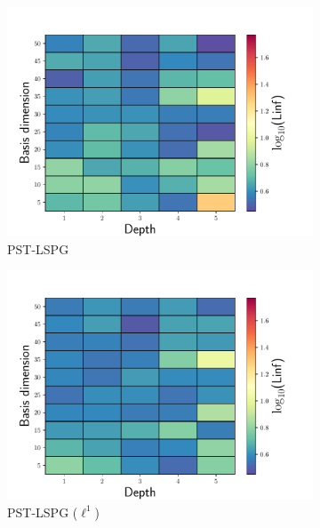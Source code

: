 \documentclass[3p,computermodern,10pt]{elsarticle}
\begin{document}
\begin{figure}
\begin{center}
\begin{subfigure}[t]{0.32\textwidth}
\includegraphics[trim={0cm 0cm 0cm 0cm},clip,width=1.0\linewidth]{code/burgers/synapse_models/basis_study/results/Linf_LS.pdf}
\caption{PST-LSPG}
\end{subfigure}
\begin{subfigure}[t]{0.32\textwidth}
\includegraphics[trim={0cm 0cm 0cm 0cm},clip,width=1.0\linewidth]{code/burgers/synapse_models/basis_study/results/Linf_L1.pdf}
\caption{PST-LSPG ($\ell^1$)}
\end{subfigure}
\begin{subfigure}[t]{0.32\textwidth}

\end{subfigure}
\end{center}
\end{figure}
\end{document}
